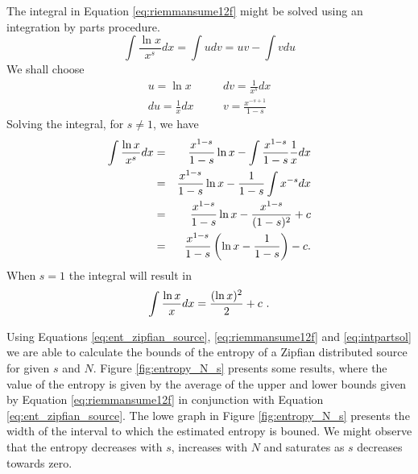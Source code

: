The integral in Equation \ref{eq:riemmansume12f} might be solved using an
integration by parts procedure. 
\begin{equation}
\label{eq:intparts}
\int \frac{\ln x}{x^s} dx = \int u dv = uv - \int v du
\end{equation}
We shall choose 
\begin{eqnarray}
\label{eq:intpartsuv}
u = \ln x           & \quad & dv = \frac{1}{x^s} dx \nonumber \\
du = \frac{1}{x} dx & \quad & v = \frac{x^{-s+1}}{1-s} 
\end{eqnarray}
Solving the integral, for $s \neq 1$, we have
\begin{eqnarray}
\label{eq:intpartsol}
\int \frac{\ln x}{x^s} dx &=& \frac{x^{1-s}}{1-s} \ln x - \int \frac{x^{1-s}}{1-s} \frac{1}{x} dx \nonumber \\
        &=& \frac{x^{1-s}}{1-s} \ln x - \frac{1}{1-s} \int x^{-s} dx \nonumber \\
        &=& \frac{x^{1-s}}{1-s} \ln x - \frac{x^{1-s}}{(1-s)^2} + c \nonumber \\
        &=& \frac{x^{1-s}}{1-s} \left( \ln x - \frac{1}{1-s} \right) - c \textmd{.}
\end{eqnarray}
When $s=1$ the integral will
result in
\begin{equation}
\label{eq:intpartss1}
\int \frac{\ln x}{x} dx = \frac{(\ln x)^2}{2} + c \textmd{ .}
\end{equation}

 
Using Equations \ref{eq:ent_zipfian_source}, \ref{eq:riemmansume12f} and \ref{eq:intpartsol}
we are able to calculate the bounds of the entropy of a Zipfian distributed source
for given $s$ and $N$. Figure \ref{fig:entropy_N_s} presents some results, where
the value of the entropy is given by the average of the upper and lower bounds given
by Equation \ref{eq:riemmansume12f} in conjunction with Equation \ref{eq:ent_zipfian_source}.
The lowe graph in Figure \ref{fig:entropy_N_s} presents the width of the interval to which
the estimated entropy is bouned. We might observe
that the entropy decreases with $s$, increases with $N$ and saturates as $s$ decreases towards zero.


